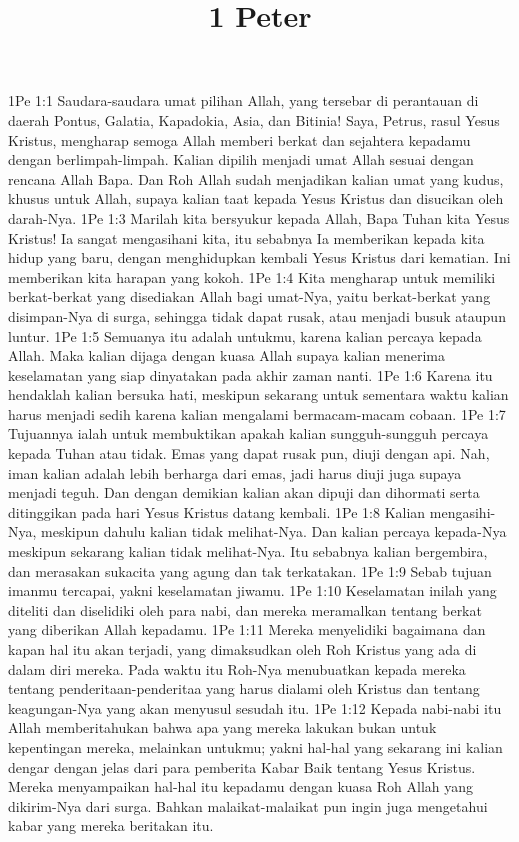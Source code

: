 

\title{1 Peter}

1Pe 1:1  Saudara-saudara umat pilihan Allah, yang tersebar di perantauan di daerah Pontus, Galatia, Kapadokia, Asia, dan Bitinia! Saya, Petrus, rasul Yesus Kristus, mengharap semoga Allah memberi berkat dan sejahtera kepadamu dengan berlimpah-limpah. Kalian dipilih menjadi umat Allah sesuai dengan rencana Allah Bapa. Dan Roh Allah sudah menjadikan kalian umat yang kudus, khusus untuk Allah, supaya kalian taat kepada Yesus Kristus dan disucikan oleh darah-Nya.
1Pe 1:3  Marilah kita bersyukur kepada Allah, Bapa Tuhan kita Yesus Kristus! Ia sangat mengasihani kita, itu sebabnya Ia memberikan kepada kita hidup yang baru, dengan menghidupkan kembali Yesus Kristus dari kematian. Ini memberikan kita harapan yang kokoh.
1Pe 1:4  Kita mengharap untuk memiliki berkat-berkat yang disediakan Allah bagi umat-Nya, yaitu berkat-berkat yang disimpan-Nya di surga, sehingga tidak dapat rusak, atau menjadi busuk ataupun luntur.
1Pe 1:5  Semuanya itu adalah untukmu, karena kalian percaya kepada Allah. Maka kalian dijaga dengan kuasa Allah supaya kalian menerima keselamatan yang siap dinyatakan pada akhir zaman nanti.
1Pe 1:6  Karena itu hendaklah kalian bersuka hati, meskipun sekarang untuk sementara waktu kalian harus menjadi sedih karena kalian mengalami bermacam-macam cobaan.
1Pe 1:7  Tujuannya ialah untuk membuktikan apakah kalian sungguh-sungguh percaya kepada Tuhan atau tidak. Emas yang dapat rusak pun, diuji dengan api. Nah, iman kalian adalah lebih berharga dari emas, jadi harus diuji juga supaya menjadi teguh. Dan dengan demikian kalian akan dipuji dan dihormati serta ditinggikan pada hari Yesus Kristus datang kembali.
1Pe 1:8  Kalian mengasihi-Nya, meskipun dahulu kalian tidak melihat-Nya. Dan kalian percaya kepada-Nya meskipun sekarang kalian tidak melihat-Nya. Itu sebabnya kalian bergembira, dan merasakan sukacita yang agung dan tak terkatakan.
1Pe 1:9  Sebab tujuan imanmu tercapai, yakni keselamatan jiwamu.
1Pe 1:10  Keselamatan inilah yang diteliti dan diselidiki oleh para nabi, dan mereka meramalkan tentang berkat yang diberikan Allah kepadamu.
1Pe 1:11  Mereka menyelidiki bagaimana dan kapan hal itu akan terjadi, yang dimaksudkan oleh Roh Kristus yang ada di dalam diri mereka. Pada waktu itu Roh-Nya menubuatkan kepada mereka tentang penderitaan-penderitaa yang harus dialami oleh Kristus dan tentang keagungan-Nya yang akan menyusul sesudah itu.
1Pe 1:12  Kepada nabi-nabi itu Allah memberitahukan bahwa apa yang mereka lakukan bukan untuk kepentingan mereka, melainkan untukmu; yakni hal-hal yang sekarang ini kalian dengar dengan jelas dari para pemberita Kabar Baik tentang Yesus Kristus. Mereka menyampaikan hal-hal itu kepadamu dengan kuasa Roh Allah yang dikirim-Nya dari surga. Bahkan malaikat-malaikat pun ingin juga mengetahui kabar yang mereka beritakan itu.
